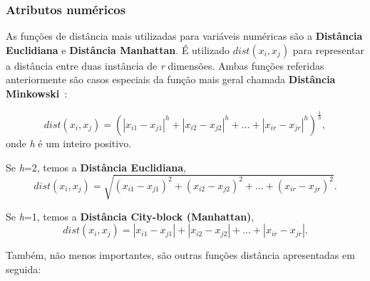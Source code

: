 \subsubsection{Atributos numéricos} \label{subsubsec: attrnum}

As funções de distância mais utilizadas para variáveis numéricas são a \textbf{Distância Euclidiana} e \textbf{Distância Manhattan}. É utilizado $ dist(x_{i}, x_{j}) $ para representar a distância entre duas instância de \textit{r} dimensões. Ambas funções referidas anteriormente são casos especiais da função mais geral chamada \textbf{Distância Minkowski}~\citet{Liu2011}:

\begin{equation}
dist(x_{i}, x_{j}) = (|x_{i1} - x_{j1}|^h + |x_{i2} - x_{j2}|^h +...+ |x_{ir} - x_{jr}|^h)^\frac{1}{h},
\label{eq:mink}
\end{equation}
onde \textit{h} é um inteiro positivo.

Se \textit{h}=2, temos a \textbf{Distância Euclidiana},
\begin{equation} 
dist(x_{i}, x_{j}) = \sqrt{(x_{i1} - x_{j1})^2 + (x_{i2} - x_{j2})^2 +...+ (x_{ir} - x_{jr})^2}.
\label{eq: euclid}
\end{equation}

Se \textit{h}=1, temos a \textbf{Distância City-block (Manhattan)},
\begin{equation}
dist(x_{i}, x_{j}) = |x_{i1} - x_{j1}| + |x_{i2} - x_{j2}| +...+ |x_{ir} - x_{jr}|.
\label{eq: manhattan}
\end{equation}

Também, não menos importantes, são outras funções distância apresentadas em seguida:

